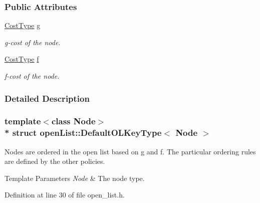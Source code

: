 \subsubsection*{Public Attributes}
\begin{DoxyCompactItemize}
\item 
\hyperlink{structopenList_1_1DefaultOLKeyType_a7ae24eab1885ae1231f6245db9f88897}{Cost\+Type} \hyperlink{structopenList_1_1DefaultOLKeyType_aa71bcf8b12c0267bb01273179aed3281}{g}\hypertarget{structopenList_1_1DefaultOLKeyType_aa71bcf8b12c0267bb01273179aed3281}{}\label{structopenList_1_1DefaultOLKeyType_aa71bcf8b12c0267bb01273179aed3281}

\begin{DoxyCompactList}\small\item\em g-\/cost of the node. \end{DoxyCompactList}\item 
\hyperlink{structopenList_1_1DefaultOLKeyType_a7ae24eab1885ae1231f6245db9f88897}{Cost\+Type} \hyperlink{structopenList_1_1DefaultOLKeyType_abcf88514a753af75873250d0b95df153}{f}\hypertarget{structopenList_1_1DefaultOLKeyType_abcf88514a753af75873250d0b95df153}{}\label{structopenList_1_1DefaultOLKeyType_abcf88514a753af75873250d0b95df153}

\begin{DoxyCompactList}\small\item\em f-\/cost of the node. \end{DoxyCompactList}\end{DoxyCompactItemize}


\subsubsection{Detailed Description}
\subsubsection*{template$<$class Node$>$\\*
struct open\+List\+::\+Default\+O\+L\+Key\+Type$<$ Node $>$}

Nodes are ordered in the open list based on g and f. The particular ordering rules are defined by the other policies. 


\begin{DoxyTemplParams}{Template Parameters}
{\em Node} & The node type. \\
\hline
\end{DoxyTemplParams}


Definition at line 30 of file open\+\_\+list.\+h.



